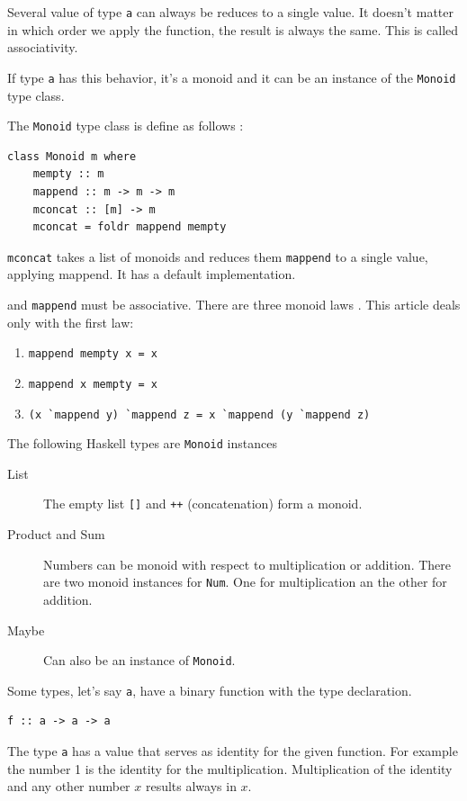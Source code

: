 Several value of type \verb|a| can always be reduces to a single value. It doesn't matter in which order we apply the function, the result is always the same. This is called associativity.

If type \verb|a| has this behavior, it's a monoid and it can be an instance of the \verb|Monoid| type class.


The \verb|Monoid| type class is define as follows \cite{monoid}:
\begin{verbatim}
class Monoid m where
    mempty :: m
    mappend :: m -> m -> m
    mconcat :: [m] -> m
    mconcat = foldr mappend mempty
\end{verbatim}
\verb|mconcat| takes a list of monoids and reduces them \verb|mappend| to a single value, applying mappend. It has a default implementation.

and \verb|mappend| must be associative. There are three monoid laws \cite{monoid}. This article deals only with the first law:

\begin{enumerate}
\item \verb|mappend mempty x = x|
\item \verb|mappend x mempty = x|
\item \verb|(x `mappend y) `mappend z = x `mappend (y `mappend z)|
\end{enumerate}

The following Haskell types are \verb|Monoid| instances
\begin{description}
\item[List] The empty list \verb|[]| and \verb|++| (concatenation) form a monoid.
\item[Product and Sum] Numbers can be monoid with respect to multiplication or addition. There are two monoid instances for \verb|Num|. One for multiplication an the other for addition.
\item[Maybe] Can also be an instance of \verb|Monoid|. 
\end{description}

Some types, let's say \verb|a|, have a binary function with the type declaration. 
\begin{verbatim}
f :: a -> a -> a
\end{verbatim}

The type \verb|a| has a value that serves as identity for the given function. For example the number 1 is the identity for the multiplication. Multiplication of the identity and any other number $x$ results always in $x$.

